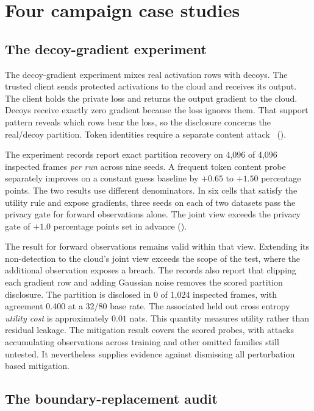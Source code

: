 \section{Four campaign case studies}
\label{sec:cases}

\subsection{The decoy-gradient experiment}
\label{sec:f1}

The decoy-gradient experiment mixes real activation rows with decoys.
The trusted client sends protected activations to the cloud and receives
its output. The client holds the private loss and returns the output
gradient to the cloud. Decoys receive exactly zero gradient because the
loss ignores them. That support pattern reveals which rows bear the loss,
so the disclosure concerns the real/decoy partition. Token identities
require a separate content attack~\citep{paper1} ().

The experiment records report exact partition recovery on 4,096 of 4,096
inspected frames \emph{per run} across nine seeds. A frequent token content
probe separately improves on a constant guess baseline by $+0.65$ to
$+1.50$ percentage points. The two results use different denominators.
In six cells that satisfy the utility rule and expose gradients, three
seeds on each of two datasets pass the privacy gate for forward
observations alone. The joint view exceeds the privacy gate of $+1.0$
percentage points set in advance ().

The result for forward observations remains valid within that view.
Extending its non-detection to the cloud's joint view exceeds the scope of
the test, where the additional observation exposes a breach. The records
also report that clipping each gradient row and adding Gaussian noise
removes the scored partition disclosure. The partition is disclosed in
0 of 1,024 inspected frames, with agreement 0.400 at a 32/80 base rate.
The associated held out cross entropy \emph{utility cost} is approximately
$0.01$ nats. This quantity measures utility rather than residual leakage.
The mitigation result covers the scored probes, with attacks accumulating
observations across training and other omitted families still untested.
It nevertheless supplies evidence against dismissing all perturbation
based mitigation.

\subsection{The boundary-replacement audit}
\label{sec:f2}

